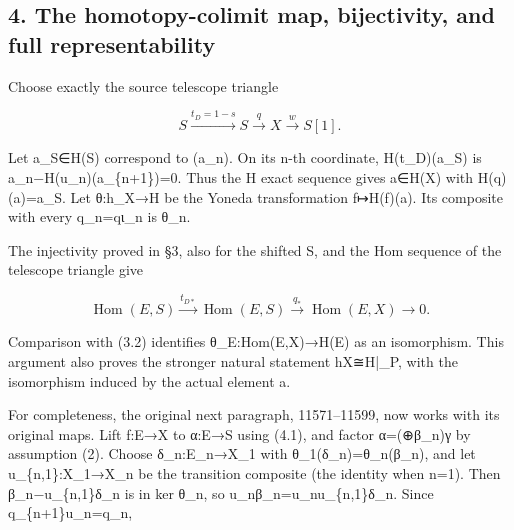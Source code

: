 \documentclass[11pt]{article}
\begin{document}
\subsection{\texorpdfstring{4. The homotopy-colimit map,\allowbreak{} bijectivity,\allowbreak{} and full representability}{4. The homotopy-colimit   and full representability}}\label{proofs-11460-11655-the-homotopy-colimit-map-bijectivity-and-full-representability}

Choose exactly the source telescope triangle

\[
 S\xrightarrow{t_D=1-s}S\xrightarrow{q}X\xrightarrow{w}S[1].
\]

Let a\_\allowbreak{}S\allowbreak{}∈H(S)\allowbreak{} correspond to (a\_\allowbreak{}n)\allowbreak{}. On its n-th coordinate,\allowbreak{} H(t\_\allowbreak{}D)\allowbreak{}(a\_\allowbreak{}S)\allowbreak{} is a\_\allowbreak{}n−H(u\_\allowbreak{}n)\allowbreak{}(a\_\allowbreak{}\{n\allowbreak{}+1\})\allowbreak{}\allowbreak{}=0. Thus the H exact sequence gives a\allowbreak{}∈H(X)\allowbreak{} with H(q)\allowbreak{}(a)\allowbreak{}\allowbreak{}=a\_\allowbreak{}S. Let θ:\allowbreak{}h\_\allowbreak{}X\allowbreak{}→H be the Yoneda transformation f\allowbreak{}↦H(f)\allowbreak{}(a)\allowbreak{}. Its composite with every q\_\allowbreak{}n\allowbreak{}=qι\_\allowbreak{}n is θ\_\allowbreak{}n.

The injectivity proved in §3,\allowbreak{} also for the shifted S,\allowbreak{} and the Hom sequence of the telescope triangle give

\[
 \operatorname{Hom}(E,S)\xrightarrow{t_{D*}}
 \operatorname{Hom}(E,S)\xrightarrow{q_*}
 \operatorname{Hom}(E,X)\longrightarrow0. \tag{4.1}
\]

Comparison with (3.2)\allowbreak{} identifies θ\_\allowbreak{}E:\allowbreak{}Hom(E,\allowbreak{}X)\allowbreak{}\allowbreak{}→H(E)\allowbreak{} as an isomorphism. This argument also proves the stronger natural statement hX≅H|\_\allowbreak{}P,\allowbreak{} with the isomorphism induced by the actual element a.

For completeness,\allowbreak{} the original next paragraph,\allowbreak{} 11571–\allowbreak{}11599,\allowbreak{} now works with its original maps. Lift f:\allowbreak{}E\allowbreak{}→X to α:\allowbreak{}E\allowbreak{}→S using (4.1)\allowbreak{},\allowbreak{} and factor α\allowbreak{}=(\allowbreak{}⊕β\_\allowbreak{}n)\allowbreak{}γ by assumption (2)\allowbreak{}. Choose δ\_\allowbreak{}n:\allowbreak{}E\_\allowbreak{}n\allowbreak{}→X\_\allowbreak{}1 with θ\_\allowbreak{}1(δ\_\allowbreak{}n)\allowbreak{}\allowbreak{}=θ\_\allowbreak{}n(β\_\allowbreak{}n)\allowbreak{},\allowbreak{} and let u\_\allowbreak{}\{n,\allowbreak{}1\}:\allowbreak{}X\_\allowbreak{}1\allowbreak{}→X\_\allowbreak{}n be the transition composite (the identity when n\allowbreak{}=1)\allowbreak{}. Then β\_\allowbreak{}n−u\_\allowbreak{}\{n,\allowbreak{}1\}δ\_\allowbreak{}n is in ker θ\_\allowbreak{}n,\allowbreak{} so u\_\allowbreak{}nβ\_\allowbreak{}n\allowbreak{}=u\_\allowbreak{}nu\_\allowbreak{}\{n,\allowbreak{}1\}δ\_\allowbreak{}n. Since q\_\allowbreak{}\{n\allowbreak{}+1\}u\_\allowbreak{}n\allowbreak{}=q\_\allowbreak{}n,\allowbreak{}
\end{document}

